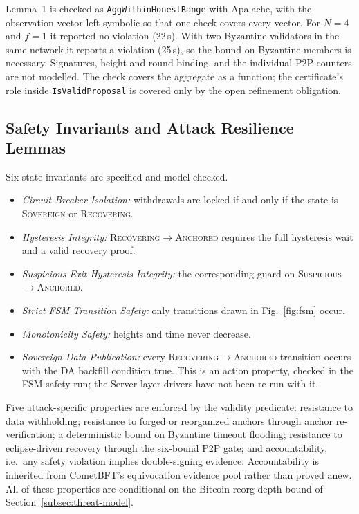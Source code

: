 Lemma~1 is checked as \texttt{AggWithinHonestRange} with Apalache, with the
observation vector left symbolic so that one check covers every vector. For
$N{=}4$ and $f{=}1$ it reported no violation (22\,s). With two Byzantine
validators in the same network it reports a violation (25\,s), so the bound
on Byzantine members is necessary. Signatures, height and round binding,
and the individual P2P counters are not modelled. The check covers the aggregate as a
function; the certificate's role inside \texttt{IsValidProposal} is covered
only by the open refinement obligation.

\subsection{Safety Invariants and Attack Resilience Lemmas}
\label{subsec:formal-invariants}

Six state invariants are specified and model-checked.
\begin{itemize}
  \item \emph{Circuit Breaker Isolation:} withdrawals are locked if and only
  if the state is \textsc{Sovereign} or \textsc{Recovering}.
  \item \emph{Hysteresis Integrity:} \textsc{Recovering}$\to$\textsc{Anchored}
  requires the full hysteresis wait and a valid recovery proof.
  \item \emph{Suspicious-Exit Hysteresis Integrity:} the corresponding guard
  on \textsc{Suspicious}$\to$\textsc{Anchored}.
  \item \emph{Strict FSM Transition Safety:} only transitions drawn in
  Fig.~\ref{fig:fsm} occur.
  \item \emph{Monotonicity Safety:} heights and time never decrease.
  \item \emph{Sovereign-Data Publication:} every
  \textsc{Recovering}$\to$\textsc{Anchored} transition occurs with the DA
  backfill condition true. This is an action property, checked in the FSM
  safety run; the Server-layer drivers have not been re-run with it.
\end{itemize}
Five attack-specific properties are enforced by the validity predicate:
resistance to data withholding; resistance to forged or reorganized anchors
through anchor re-verification; a deterministic bound on Byzantine
timeout flooding; resistance to eclipse-driven recovery through the
six-bound P2P gate; and accountability, i.e.\ any safety violation implies
double-signing evidence. Accountability is inherited from CometBFT's
equivocation evidence pool rather than proved anew. All of these properties
are conditional on the Bitcoin reorg-depth bound of
Section~\ref{subsec:threat-model}.

